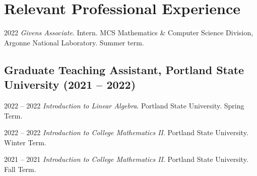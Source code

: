 \documentclass[12pt,letterpaper]{report}
\begin{document}
         

    
    	

	\section*{Relevant Professional Experience}

	\begin{tablist}

        \item[2022] \tab \emph{Givens Associate}. Intern. MCS Mathematics \& Computer Science Division, Argonne National Laboratory. Summer term.

	\end{tablist}


    \subsection*{Graduate Teaching Assistant, Portland State University (2021 -- 2022)}

    \begin{tablist}

        \item[2022 -- 2022] \tab \emph{Introduction to Linear Algebra}. Portland State University. Spring Term.

        \item[2022 -- 2022] \tab \emph{Introduction to College Mathematics II}. Portland State University. Winter Term.

        \item[2021 -- 2021] \tab \emph{Introduction to College Mathematics II}. Portland State University. Fall Term. 
    
    \end{tablist}
\end{document}
